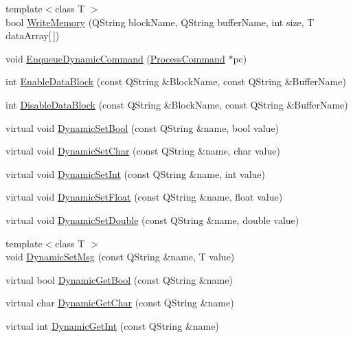 \begin{DoxyCompactItemize}
\item 
{\footnotesize template$<$class T $>$ }\\bool \hyperlink{classGRIProcessThread_a97e988e0266ca606a5c2c5d429ac26ba}{\-Write\-Memory} (\-Q\-String block\-Name, \-Q\-String buffer\-Name, int size, \-T data\-Array\mbox{[}$\,$\mbox{]})
\item 
void \hyperlink{classGRIProcessThread_a94fc2d793e1d4c80bc5c3759c3a5a741}{\-Enqueue\-Dynamic\-Command} (\hyperlink{structProcessCommand}{\-Process\-Command} $\ast$pc)
\item 
int \hyperlink{classGRIProcessThread_a8e5950dcffc4301e72628291bf999bc1}{\-Enable\-Data\-Block} (const \-Q\-String \&\-Block\-Name, const \-Q\-String \&\-Buffer\-Name)
\item 
int \hyperlink{classGRIProcessThread_aaf1b22af60730fef9c7082831b5a2de4}{\-Disable\-Data\-Block} (const \-Q\-String \&\-Block\-Name, const \-Q\-String \&\-Buffer\-Name)
\item 
virtual void \hyperlink{classGRIProcessThread_a7bc51634da2c1ef7af42c88fbf167805}{\-Dynamic\-Set\-Bool} (const \-Q\-String \&name, bool value)
\item 
virtual void \hyperlink{classGRIProcessThread_a6deaea017ac8627dfdcff829988b1acd}{\-Dynamic\-Set\-Char} (const \-Q\-String \&name, char value)
\item 
virtual void \hyperlink{classGRIProcessThread_aeedab81fc8bad893f9200655bd7511a0}{\-Dynamic\-Set\-Int} (const \-Q\-String \&name, int value)
\item 
virtual void \hyperlink{classGRIProcessThread_a5bfcb71eb8f7b36b25b9c8af81326348}{\-Dynamic\-Set\-Float} (const \-Q\-String \&name, float value)
\item 
virtual void \hyperlink{classGRIProcessThread_a4c632e14a34cda838bbba501327b7d1e}{\-Dynamic\-Set\-Double} (const \-Q\-String \&name, double value)
\item 
{\footnotesize template$<$class T $>$ }\\void \hyperlink{classGRIProcessThread_a1f24152d976a4ac5713b1da31f745997}{\-Dynamic\-Set\-Msg} (const \-Q\-String \&name, \-T value)
\item 
virtual bool \hyperlink{classGRIProcessThread_ac7413294d4249678922da1297408a505}{\-Dynamic\-Get\-Bool} (const \-Q\-String \&name)
\item 
virtual char \hyperlink{classGRIProcessThread_acd345786baf6ecc175b4184989b26cd7}{\-Dynamic\-Get\-Char} (const \-Q\-String \&name)
\item 
virtual int \hyperlink{classGRIProcessThread_a750ed0f96d5881ff51800c7317d4ffd4}{\-Dynamic\-Get\-Int} (const \-Q\-String \&name)

\end{DoxyCompactItemize}
